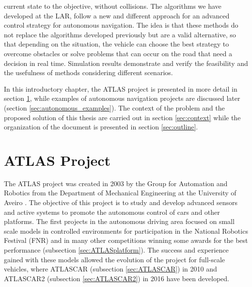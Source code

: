 current state to the objective, without collisions. The algorithms we have developed at the LAR, follow a new and different approach for an advanced control strategy for autonomous navigation. The idea is that these methods do not replace the algorithms developed previously but are a valid alternative, so that depending on the situation, the vehicle can choose the best strategy to overcome obstacles or solve problems that can occur on the road that need a decision in real time.  Simulation results demonstrate and verify the feasibility and the usefulness of methods considering different scenarios.

In this introductory chapter, the ATLAS project is presented in more detail in section \ref{sec:ATLAS}, while examples of autonomous navigation projects are discussed later (section \ref{sec:autonomous_examples}). The context of the problem and the proposed solution of this thesis are carried out in section \ref{sec:context} while the organization of the document is presented in section \ref{sec:outline}.
\section{ATLAS Project}\label{sec:ATLAS}
The ATLAS project was created in 2003 by the Group for Automation and Robotics from the Department of Mechanical Engineering at the University of Aveiro \cite{vsantos2010}. The objective of this project is to study and develop advanced sensors and active systems to promote the autonomous control of cars and other platforms. The first projects in the autonomous driving area focused on small scale models in controlled environments for participation in the National Robotics Festival (FNR) and in many other competitions winning some awards for the best performance (subsection \ref{sec:ATLASplatform}). The success and experience gained with these models allowed the evolution of the project for full-scale vehicles, where ATLASCAR (subsection \ref{sec:ATLASCAR}) in 2010 and ATLASCAR2 (subsection \ref{sec:ATLASCAR2}) in 2016 have been developed.

